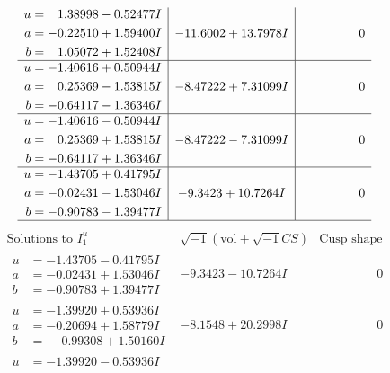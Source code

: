 \documentclass[1p]{elsarticle_modified}
\theoremstyle{definition}
\newcommand{\I}{\sqrt{-1}}
\begin{document}
$$\begin{array}{c|c|c}
\begin{aligned}
u &= \phantom{-}1.38998 - 0.52477 I \\
a &= -0.22510 + 1.59400 I \\
b &= \phantom{-}1.05072 + 1.52408 I\end{aligned}
 & -11.6002 + 13.7978 I & \phantom{-0.000000 } 0 \\ \hline\begin{aligned}
u &= -1.40616 + 0.50944 I \\
a &= \phantom{-}0.25369 - 1.53815 I \\
b &= -0.64117 - 1.36346 I\end{aligned}
 & -8.47222 + 7.31099 I & \phantom{-0.000000 } 0 \\ \hline\begin{aligned}
u &= -1.40616 - 0.50944 I \\
a &= \phantom{-}0.25369 + 1.53815 I \\
b &= -0.64117 + 1.36346 I\end{aligned}
 & -8.47222 - 7.31099 I & \phantom{-0.000000 } 0 \\ \hline\begin{aligned}
u &= -1.43705 + 0.41795 I \\
a &= -0.02431 - 1.53046 I \\
b &= -0.90783 - 1.39477 I\end{aligned}
 & -9.3423 + 10.7264 I & \phantom{-0.000000 } 0\\
 \hline 
 \end{array}$$\newpage$$\begin{array}{c|c|c}  
\text{Solutions to }I^u_{1}& \I (\text{vol} + \sqrt{-1}CS) & \text{Cusp shape}\\
 \hline 
\begin{aligned}
u &= -1.43705 - 0.41795 I \\
a &= -0.02431 + 1.53046 I \\
b &= -0.90783 + 1.39477 I\end{aligned}
 & -9.3423 - 10.7264 I & \phantom{-0.000000 } 0 \\ \hline\begin{aligned}
u &= -1.39920 + 0.53936 I \\
a &= -0.20694 + 1.58779 I \\
b &= \phantom{-}0.99308 + 1.50160 I\end{aligned}
 & -8.1548 + 20.2998 I & \phantom{-0.000000 } 0 \\ \hline\begin{aligned}
u &= -1.39920 - 0.53936 I \\

\end{aligned}
\end{array}$$
\end{document}
